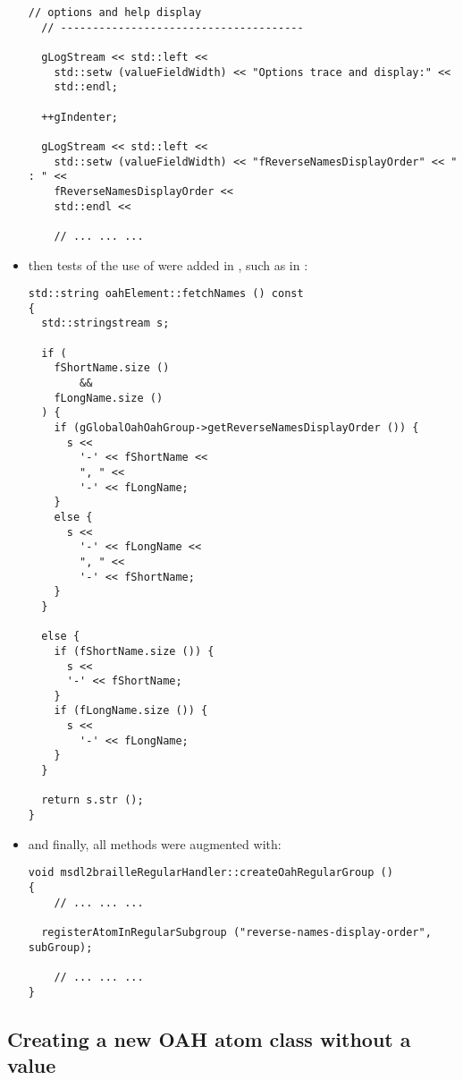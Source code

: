 \begin{itemize}
\begin{lstlisting}[language=CPlusPlus]
  // options and help display
  // --------------------------------------

  gLogStream << std::left <<
    std::setw (valueFieldWidth) << "Options trace and display:" <<
    std::endl;

  ++gIndenter;

  gLogStream << std::left <<
    std::setw (valueFieldWidth) << "fReverseNamesDisplayOrder" << " : " <<
    fReverseNamesDisplayOrder <<
    std::endl <<

	// ... ... ...
\end{lstlisting}

\item then tests of the use of  were added in , such as in :
\begin{lstlisting}[language=CPlusPlus]
std::string oahElement::fetchNames () const
{
  std::stringstream s;

  if (
    fShortName.size ()
        &&
    fLongName.size ()
  ) {
    if (gGlobalOahOahGroup->getReverseNamesDisplayOrder ()) {
      s <<
        '-' << fShortName <<
        ", " <<
        '-' << fLongName;
    }
    else {
      s <<
        '-' << fLongName <<
        ", " <<
        '-' << fShortName;
    }
  }

  else {
    if (fShortName.size ()) {
      s <<
      '-' << fShortName;
    }
    if (fLongName.size ()) {
      s <<
        '-' << fLongName;
    }
  }

  return s.str ();
}
\end{lstlisting}

\item and finally, all  methods were augmented with:
\begin{lstlisting}[language=CPlusPlus]
 void msdl2brailleRegularHandler::createOahRegularGroup ()
{
	// ... ... ...

  registerAtomInRegularSubgroup ("reverse-names-display-order", subGroup);

	// ... ... ...
}
\end{lstlisting}

\end{itemize}


\subsection{Creating a new OAH atom class   without a value}

